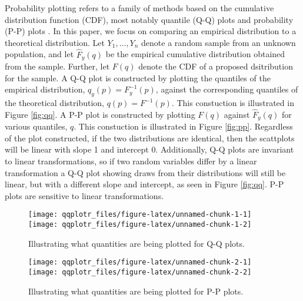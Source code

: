 Probability plotting refers to a family of methods based on the
cumulative distribution function (CDF), most notably quantile (Q-Q)
plots and probability (P-P) plots \citep{Wilk1968-ii}. In this paper, we
focus on comparing an empirical distribution to a theoretical
distribution. Let \(Y_1, \ldots, Y_n\) denote a random sample from an
unknown population, and let \(\widehat{F}_y(q)\) be the empirical
cumulative distribution obtained from the sample. Further, let \(F(q)\)
denote the CDF of a proposed dsitribution for the sample. A Q-Q plot is
constructed by plotting the quantiles of the empirical distribution,
\(q_y(p) = F_y^{-1}(p)\), against the corresponding quantiles of the
theoretical distribution, \(q(p) = F^{-1}(p)\). This constuction is
illustrated in Figure \ref{fig:qq}. A P-P plot is constructed by
plotting \(F(q)\) against \(\widehat{F}_y(q)\) for various quantiles,
\(q\). This constuction is illustrated in Figure \ref{fig:pp}.
Regardless of the plot constructed, if the two distributions are
identical, then the scattplots will be linear with slope 1 and intercept
0. Additionally, Q-Q plots are invariant to linear transformations, so
if two random variables differ by a linear transformation a Q-Q plot
showing draws from their distributions will still be linear, but with a
different slope and intercept, as seen in Figure \ref{fig:qq}. P-P plots
are sensitive to linear transformations.

\begin{Schunk}
\begin{figure}

{\centering \texttt{[image: qqplotr\_files/figure-latex/unnamed-chunk-1-1]} \texttt{[image: qqplotr\_files/figure-latex/unnamed-chunk-1-2]} 

}

\caption{\label{fig:qq}Illustrating what quantities are being plotted for Q-Q plots.}\label{fig:unnamed-chunk-1}
\end{figure}
\end{Schunk}

\begin{Schunk}
\begin{figure}

{\centering \texttt{[image: qqplotr\_files/figure-latex/unnamed-chunk-2-1]} \texttt{[image: qqplotr\_files/figure-latex/unnamed-chunk-2-2]} 

}

\caption{\label{fig:pp}Illustrating what quantities are being plotted for P-P plots.}\label{fig:unnamed-chunk-2}
\end{figure}
\end{Schunk}

